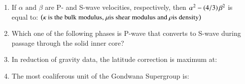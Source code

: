 \documentclass[journal,12pt,onecolumn]{IEEEtran}
\theoremstyle{remark}
\begin{document}
\begin{enumerate}
    \item If $\alpha\text{ and }\beta$ are P- and S-wave velocities, respectively, then $\alpha^{2}-\left(4/3\right)\beta^{2}$ is equal to: $\left(\kappa \text{ is the bulk modulus, } \mu \text{is shear modulus and } \rho \text{is density}\right)$ \hfill{}
        \begin{enumerate}
        \end{enumerate}
    
    \item Which one of the following phases is P-wave that converts to S-wave during passage through the solid inner core? \hfill{}
        \begin{enumerate}
        \end{enumerate}
        
    \item In reduction of gravity data, the latitude correction is maximum at: \hfill{}
        \begin{enumerate}
        \end{enumerate}
    
    \item The most coaliferous unit of the Gondwana Supergroup is: \hfill{}
        \begin{enumerate}
        \end{enumerate}
    

\end{enumerate}
\end{document}
